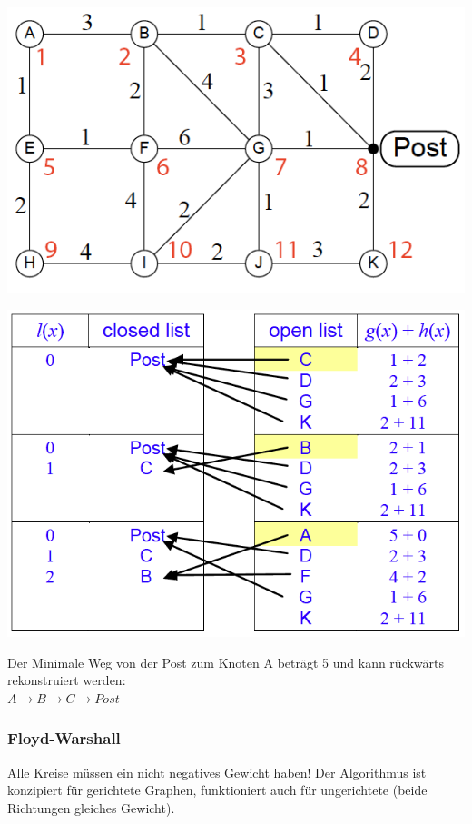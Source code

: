 \begin{minipage}{0.5\textwidth}
	\includegraphics[width=\textwidth]{Content/Graphen/PostAStar.png}
\end{minipage}
\begin{minipage}{0.5\textwidth}
	\includegraphics[width=\textwidth]{Content/Graphen/AStar.png}
\end{minipage}

Der Minimale Weg von der Post zum Knoten A beträgt 5 und kann rückwärts rekonstruiert werden:\\ $A\rightarrow B\rightarrow C \rightarrow Post$\\

\subsubsection{Floyd-Warshall}
Alle Kreise müssen ein nicht negatives Gewicht haben! Der Algorithmus ist konzipiert für gerichtete Graphen, funktioniert auch für ungerichtete (beide Richtungen gleiches Gewicht).


